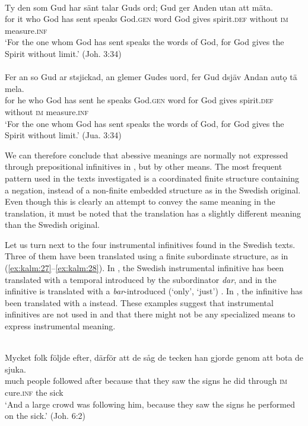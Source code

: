 \documentclass[output=paper]{langscibook}
\begin{document}
\ea
\label{ex:kalm:26}
\ea {}\label{ex:kalm:26a}\\
\gll Ty den som Gud har sänt talar Guds ord; Gud ger Anden utan att mäta.\\
for it who God has sent speaks God.\textsc{gen} word God gives spirit.\textsc{def} without \textsc{im} measure.\textsc{inf}\\
\glt ‘For the one whom God has sent speaks the words of God, for God gives the Spirit without limit.’ (Joh. 3:34)\\

\ex {}\label{ex:kalm:26b}\\
\gll Fer an so Gud ar stsjickad, an glemer Gudes uord, fer Gud dsjäv Andan autǫ tä mela.\\
for he who God has sent he speaks God.\textsc{gen} word for God gives spirit.\textsc{def} without \textsc{im} measure.\textsc{inf}\\
\glt ‘For the one whom God has sent speaks the words of God, for God gives the Spirit without limit.’ (Jua. 3:34)
\z
\z 


We can therefore conclude that abessive meanings are normally not expressed through prepositional infinitives in , but by other means. The most frequent pattern used in the texts investigated is a coordinated finite structure containing a negation, instead of a non-finite embedded structure as in the Swedish original. Even though this is clearly an attempt to convey the same meaning in the translation, it must be noted that the translation has a slightly different meaning than the Swedish original. 



Let us turn next to the four instrumental infinitives found in the Swedish texts. Three of them have been translated using a finite subordinate structure, as in (\ref{ex:kalm:27}–\ref{ex:kalm:28}). In , the Swedish instrumental infinitive has been translated with a temporal  introduced by the subordinator \textit{dar}, and in  the infinitive is translated with a \textit{bar}-introduced (‘only’, ‘just’) . In , the infinitive has been translated with a  instead. These examples suggest that instrumental infinitives are not used in  and that there might not be any specialized means to express instrumental meaning. 


\ea
\label{ex:kalm:27}
\ea {}\label{ex:kalm:27a}\\
\gll Mycket folk följde efter, därför att de såg de tecken han gjorde genom att bota de sjuka.\\
 much people followed after because that they saw the signs he did through \textsc{im} cure.\textsc{inf} the sick\\
\glt ‘And a large crowd was following him, because they saw the signs he performed on the sick.’ (Joh. 6:2)\\
\end{document}

